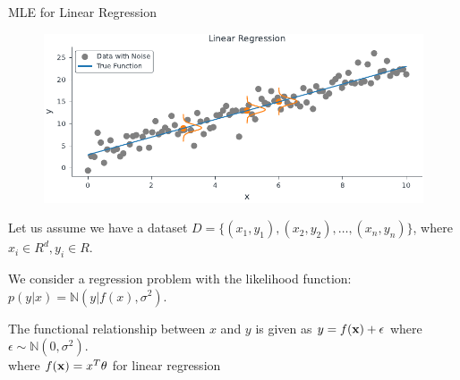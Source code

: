 \documentclass{beamer}
\begin{document}
\begin{frame}{MLE for Linear Regression}
\begin{figure}
                \centerline{\includegraphics[scale=0.8]{../figures/mle/true_function_noise_normal_lin_reg.pdf}}
\end{figure}
\end{frame}
\begin{frame}
Let us assume we have a dataset $D = \{(x_1, y_1), (x_2,y_2), \ldots, (x_n, y_n)\}$, where $x_i\in R^d, y_i\in R$. 

\vspace{10pt}
\pause We consider a regression problem with the likelihood function: $p(y|x) = \mathbb{N}(y|f(x), \sigma^2)$.\\
\end{frame}

\begin{frame}
The functional relationship between $x$ and $y$ is given as $y = f(\bold{x})+\epsilon$ where $\epsilon\sim \mathbb{N}(0, \sigma^2).$ \\ 

\vspace{10pt}
\pause where $f(\bold{x}) = x^T\theta$ for linear regression\\ 

\vspace{10pt}
\pause {}

\end{frame}
\end{document}
